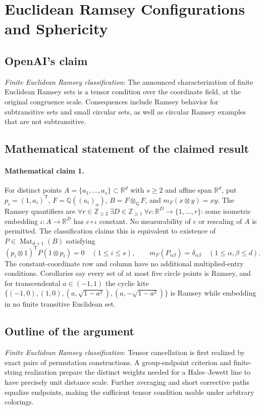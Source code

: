 \documentclass[11pt]{article}
\begin{document}
\section*{Euclidean Ramsey Configurations and Sphericity}

\subsection{OpenAI's claim}
\textit{Finite Euclidean Ramsey classification}: The announced characterization of finite Euclidean Ramsey sets is a tensor condition over the coordinate field, at the original congruence scale. Consequences include Ramsey behavior for subtransitive sets and small circular sets, as well as circular Ramsey examples that are not subtransitive.

\subsection{Mathematical statement of the claimed result}
\paragraph{Mathematical claim 1.} For distinct points $A=\{a_1,\ldots,a_s\}\subset\mathbb R^d$ with $s\ge2$ and affine span $\mathbb R^d$, put $p_i=(1,a_i)^{\mathsf T}$, $F=\mathbb Q((a_i)_\alpha)$, $B=F\otimes_{\mathbb Q}F$, and $m_F(x\otimes y)=xy$. The Ramsey quantifiers are $\forall r\in\mathbb Z_{\ge2}\ \exists D\in\mathbb Z_{\ge1}\ \forall c:\mathbb R^D\to\{1,\ldots,r\}$: some isometric embedding $\iota:A\to\mathbb R^D$ has $c\circ\iota$ constant. No measurability of $c$ or rescaling of $A$ is permitted. The classification claims this is equivalent to existence of $P\in\operatorname{Mat}_{d+1}(B)$ satisfying \[(p_i\otimes1)^{\mathsf T}P(1\otimes p_i)=0\quad(1\le i\le s),\qquad m_F(P_{\alpha\beta})=\delta_{\alpha\beta}\quad(1\le\alpha,\beta\le d).\] The constant-coordinate row and column have no additional multiplied-entry conditions. Corollaries say every set of at most five circle points is Ramsey, and for transcendental $a\in(-1,1)$ the cyclic kite $\{(-1,0),(1,0),(a,\sqrt{1-a^2}),(a,-\sqrt{1-a^2})\}$ is Ramsey while embedding in no finite transitive Euclidean set.

\subsection{Outline of the argument}
\textit{Finite Euclidean Ramsey classification}: Tensor cancellation is first realized by exact pairs of permutation constructions. A group-endpoint criterion and finite-string realization prepare the distinct weights needed for a Hales--Jewett line to have precisely unit distance scale. Further averaging and short corrective paths equalize endpoints, making the sufficient tensor condition usable under arbitrary colorings.
\end{document}
